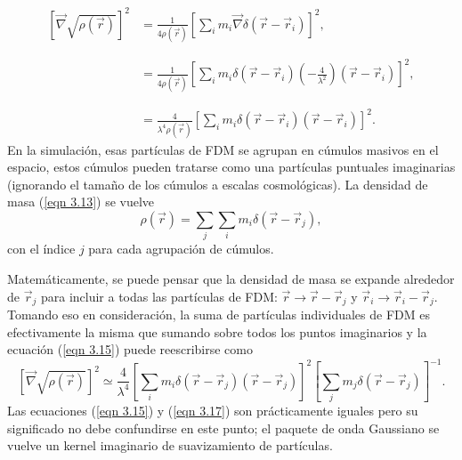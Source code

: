 \documentclass[a4paper,openright,12pt]{book}
\begin{document}
\begin{equation}
\begin{array}{ll}
\left[\vec{\nabla}\sqrt{\rho (\vec{r})}\right]^{2} &=
\frac{1}{4\rho(\vec{r})}\left[\sum_{i} m_{i}\vec{\nabla}\delta(\vec{r}-\vec{r}_{i})\right]^{2}, \\\\\\ 
&=
\frac{1}{4\rho(\vec{r})} 
\left[\sum_{i}
m_{i}\delta(\vec{r}-\vec{r}_{i})(-\frac{4}{\lambda^{2}})(\vec{r}-\vec{r}_{i})\right]^{2}, \\\\\\
&=
\frac{4}{\lambda^{4}\rho(\vec{r})}
\left[
\sum_{i} m_{i}\delta(\vec{r}-\vec{r}_{i})(\vec{r}-\vec{r}_{i})
\right]^{2}. \label{eqn 3.15}

\end{array}
\end{equation}
En la simulación, esas partículas de FDM se agrupan en cúmulos masivos en el espacio, estos cúmulos pueden tratarse como una partículas puntuales imaginarias (ignorando el tamaño de los cúmulos a escalas cosmológicas). La densidad de masa (\ref{eqn 3.13}) se vuelve
\begin{equation}
\rho(\vec{r})
=
\sum_{j}\sum_{i}m_{i}\delta(\vec{r}-\vec{r}_{j}),\label{eqn 3.16}
\end{equation} 
con el índice $j$ para cada agrupación de cúmulos. 

Matemáticamente, se puede pensar que la densidad de masa se expande alrededor de $\vec{r}_{j}$ para incluir a todas las partículas de FDM: $\vec{r} \rightarrow \vec{r}-\vec{r}_{j}$ y $\vec{r}_{i} \rightarrow \vec{r}_{i} - \vec{r}_{j}$. Tomando eso en consideración, la suma de partículas individuales de FDM es efectivamente la misma que sumando sobre todos los puntos imaginarios y la ecuación (\ref{eqn 3.15}) puede reescribirse como 
\begin{equation}
\left[\vec{\nabla}\sqrt{\rho (\vec{r})}\right]^{2} \simeq 
\frac{4}{\lambda^{4}}
\left[
\sum_{i}m_{i}\delta(\vec{r}-\vec{r}_{j})(\vec{r}-\vec{r}_{j})
\right]^{2}
\left[
\sum_{j}m_{j}\delta(\vec{r}-\vec{r}_{j})
\right]^{-1}. \label{eqn 3.17}
\end{equation}
Las ecuaciones (\ref{eqn 3.15}) y (\ref{eqn 3.17}) son prácticamente iguales pero su significado no debe confundirse en este punto; el paquete de onda Gaussiano se vuelve un kernel imaginario de suavizamiento de partículas.
\end{document}
